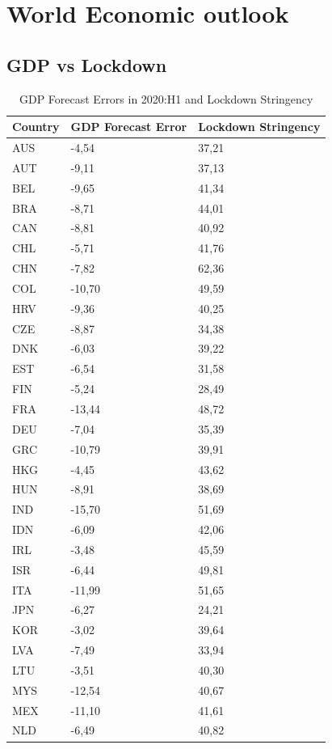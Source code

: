 \documentclass{SelfArx}
\begin{document}
\section*{World Economic outlook}
\label{sec:org569686c}


\subsection*{GDP vs Lockdown}
\label{sec:org1845083}
\begin{table}[htbp]
\caption{\label{IMF_fig_1}GDP Forecast Errors in 2020:H1 and Lockdown Stringency}
\centering
\begin{tabular}{lll}
\hline
Country & GDP Forecast Error & Lockdown Stringency\\
\hline
AUS & -4,54 & 37,21\\
AUT & -9,11 & 37,13\\
BEL & -9,65 & 41,34\\
BRA & -8,71 & 44,01\\
CAN & -8,81 & 40,92\\
CHL & -5,71 & 41,76\\
CHN & -7,82 & 62,36\\
COL & -10,70 & 49,59\\
HRV & -9,36 & 40,25\\
CZE & -8,87 & 34,38\\
DNK & -6,03 & 39,22\\
EST & -6,54 & 31,58\\
FIN & -5,24 & 28,49\\
FRA & -13,44 & 48,72\\
DEU & -7,04 & 35,39\\
GRC & -10,79 & 39,91\\
HKG & -4,45 & 43,62\\
HUN & -8,91 & 38,69\\
IND & -15,70 & 51,69\\
IDN & -6,09 & 42,06\\
IRL & -3,48 & 45,59\\
ISR & -6,44 & 49,81\\
ITA & -11,99 & 51,65\\
JPN & -6,27 & 24,21\\
KOR & -3,02 & 39,64\\
LVA & -7,49 & 33,94\\
LTU & -3,51 & 40,30\\
MYS & -12,54 & 40,67\\
MEX & -11,10 & 41,61\\
NLD & -6,49 & 40,82\\

\end{tabular}
\end{table}
\end{document}
